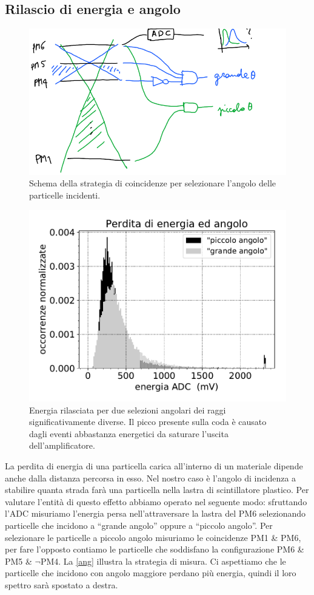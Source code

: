 \subsection{Rilascio di energia e angolo}   %

\begin{figure}
	\centering
	\includegraphics[width=8 cm]{ang}
	\caption{Schema della strategia di coincidenze per selezionare l'angolo delle particelle incidenti.}
	\label{ang}
\end{figure}

\begin{figure}
	\centering
	\includegraphics[width=10 cm]{angoli}
	\caption{Energia rilasciata per due selezioni angolari dei raggi significativamente diverse.
	Il picco presente sulla coda è causato dagli eventi abbastanza energetici da saturare l'uscita dell'amplificatore.}
	\label{isto}
\end{figure}

La perdita di energia di una particella carica all'interno di un materiale dipende anche dalla distanza percorsa in esso.
Nel nostro caso è l'angolo di incidenza a stabilire quanta strada farà una particella nella lastra di scintillatore plastico. Per valutare l'entità di questo effetto abbiamo operato nel seguente modo: sfruttando l'ADC misuriamo l'energia persa nell'attraversare la lastra del PM6 selezionando particelle che incidono a ``grande angolo'' oppure a ``piccolo angolo''.
Per selezionare le particelle a piccolo angolo misuriamo le coincidenze PM1 \& PM6, per fare l'opposto contiamo le particelle che soddisfano la configurazione PM6 \& PM5 \& $\neg$PM4.
La \autoref{ang} illustra la strategia di misura. Ci aspettiamo che le particelle che incidono con angolo maggiore perdano più energia, quindi il loro spettro sarà spostato a destra.

